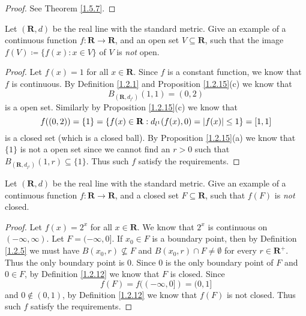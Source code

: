 \begin{proof}
    See Theorem \ref{1.5.7}.
\end{proof}

\begin{exercise}\label{ex 1.5.4}
    Let \((\mathbf{R}, d)\) be the real line with the standard metric.
    Give an example of a continuous function \(f : \mathbf{R} \to \mathbf{R}\), and an open set \(V \subseteq \mathbf{R}\), such that the image \(f(V) \coloneqq \{f(x) : x \in V\}\) of \(V\) is \emph{not} open.
\end{exercise}

\begin{proof}
    Let \(f(x) = 1\) for all \(x \in \mathbf{R}\).
    Since \(f\) is a constant function, we know that \(f\) is continuous.
    By Definition \ref{1.2.1} and Proposition \ref{1.2.15}(c) we know that
    \[
        B_{(\mathbf{R}, d_{l^1})}(1, 1) = (0, 2)
    \]
    is a open set.
    Similarly by Proposition \ref{1.2.15}(c) we know that
    \[
        f((0, 2)) = \{1\} = \{f(x) \in \mathbf{R} : d_{l^1}(f(x), 0) = \abs*{f(x)} \leq 1\} = [1, 1]
    \]
    is a closed set (which is a closed ball).
    By Proposition \ref{1.2.15}(a) we know that \(\{1\}\) is not a open set since we cannot find an \(r > 0\) such that \(B_{(\mathbf{R}, d_{l^1})}(1, r) \subseteq \{1\}\).
    Thus such \(f\) satisfy the requirements.
\end{proof}

\begin{exercise}\label{ex 1.5.5}
    Let \((\mathbf{R}, d)\) be the real line with the standard metric.
    Give an example of a continuous function \(f : \mathbf{R} \to \mathbf{R}\), and a closed set \(F \subseteq \mathbf{R}\), such that \(f(F)\) is \emph{not} closed.
\end{exercise}

\begin{proof}
    Let \(f(x) = 2^x\) for all \(x \in \mathbf{R}\).
    We know that \(2^x\) is continuous on \((-\infty, \infty)\).
    Let \(F = (-\infty, 0]\).
    If \(x_0 \in F\) is a boundary point, then by Definition \ref{1.2.5} we must have \(B(x_0, r) \not\subseteq F\) and \(B(x_0, r) \cap F \neq \emptyset\) for every \(r \in \mathbf{R}^+\).
    Thus the only boundary point is \(0\).
    Since \(0\) is the only boundary point of \(F\) and \(0 \in F\), by Definition \ref{1.2.12} we know that \(F\) is closed.
    Since
    \[
        f(F) = f((-\infty, 0]) = (0, 1]
    \]
    and \(0 \notin (0, 1)\), by Definition \ref{1.2.12} we know that \(f(F)\) is not closed.
    Thus such \(f\) satisfy the requirements.
\end{proof}


